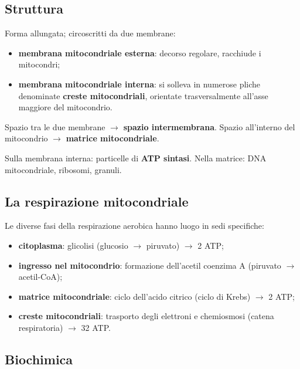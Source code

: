 \subsection{Struttura}

Forma allungata; circoscritti da due membrane:
\begin{itemize}
  \item \textbf{membrana mitocondriale esterna}: decorso regolare, racchiude i mitocondri;
  \item \textbf{membrana mitocondriale interna}: si solleva in numerose pliche denominate \textbf{creste mitocondriali}, orientate trasversalmente all'asse maggiore del mitocondrio.
\end{itemize}
Spazio tra le due membrane $\rightarrow$ \textbf{spazio intermembrana}. Spazio all'interno del mitocondrio $\rightarrow$ \textbf{matrice mitocondriale}.

Sulla membrana interna: particelle di \textbf{ATP sintasi}. Nella matrice: DNA mitocondriale, ribosomi, granuli.

\subsection{La respirazione mitocondriale}

Le diverse fasi della respirazione aerobica hanno luogo in sedi specifiche:
\begin{itemize}
  \item \textbf{citoplasma}: glicolisi (glucosio $\rightarrow$ piruvato) $\rightarrow$ 2 ATP;
  \item \textbf{ingresso nel mitocondrio}: formazione dell'acetil coenzima A (piruvato $\rightarrow$ acetil-CoA);
  \item \textbf{matrice mitocondriale}: ciclo dell'acido citrico (ciclo di Krebs) $\rightarrow$ 2 ATP;
  \item \textbf{creste mitocondriali}: trasporto degli elettroni e chemiosmosi (catena respiratoria) $\rightarrow$ 32 ATP.
\end{itemize}

\subsection{Biochimica}

